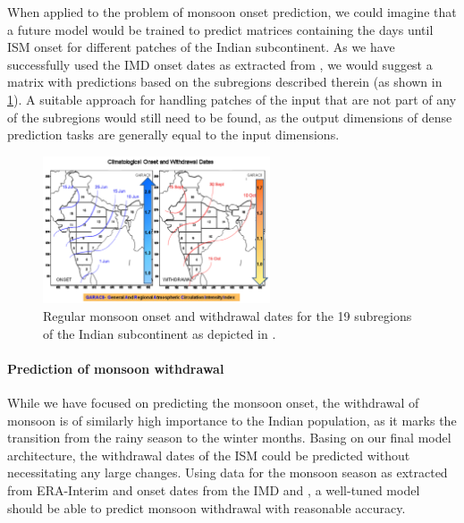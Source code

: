 When applied to the problem of monsoon onset prediction, we could imagine that a future model would be trained to predict matrices containing the days until ISM onset for different patches of the Indian subcontinent. As we have successfully used the IMD onset dates as extracted from \citet{Singh.2009}, we would suggest a matrix with predictions based on the subregions described therein (as shown in \cref{fig:singh_subregions}). A suitable approach for handling patches of the input that are not part of any of the subregions would still need to be found, as the output dimensions of dense prediction tasks are generally equal to the input dimensions.

\begin{figure}[h!]
  \centering
  \includegraphics[width=0.6\textwidth]{./99_appendix/img/singh_subregions.png}
  \caption{Regular monsoon onset and withdrawal dates for the 19 subregions of the Indian subcontinent as depicted in \citet{Singh.2009}.}
  \label{fig:singh_subregions}
\end{figure}

\paragraph{Prediction of monsoon withdrawal}
While we have focused on predicting the monsoon onset, the withdrawal of monsoon is of similarly high importance to the Indian population, as it marks the transition from the rainy season to the winter months. Basing on our final model architecture, the withdrawal dates of the ISM could be predicted without necessitating any large changes. Using data for the monsoon season as extracted from ERA-Interim and onset dates from the IMD and \citet{Singh.2009}, a well-tuned model should be able to predict monsoon withdrawal with reasonable accuracy.
